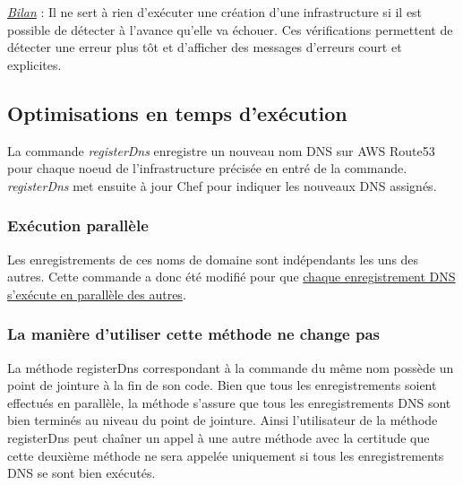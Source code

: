 \underline{\textit{Bilan}} :  Il ne sert à rien d'exécuter une création d'une
infrastructure si il est possible de détecter à l'avance qu'elle va échouer.  
Ces vérifications permettent de détecter une erreur plus tôt et d'afficher des
messages d'erreurs court et explicites.





\subsection{Optimisations en temps d'exécution}

La commande \textit{registerDns} enregistre un nouveau nom DNS sur AWS Route53
pour chaque noeud de l'infrastructure précisée en entré de la
commande. \textit{registerDns} met ensuite à jour Chef pour indiquer les
nouveaux DNS assignés.

\subsubsection{Exécution parallèle}

Les enregistrements de ces noms de domaine sont indépendants les uns des autres.
Cette commande a donc été modifié pour que \underline{chaque enregistrement DNS
  s'exécute en parallèle des autres}.

\subsubsection{La manière d'utiliser cette méthode ne change pas}

La méthode registerDns correspondant à la commande du même nom possède un point
de jointure à la fin de son code. Bien que tous les enregistrements soient
effectués en parallèle, la méthode s'assure que tous les enregistrements DNS
sont bien terminés au niveau du point de jointure. 
Ainsi l'utilisateur de la méthode registerDns peut chaîner un appel à une autre
méthode avec la certitude que cette deuxième méthode ne sera appelée uniquement
si tous les enregistrements DNS se sont bien exécutés.

